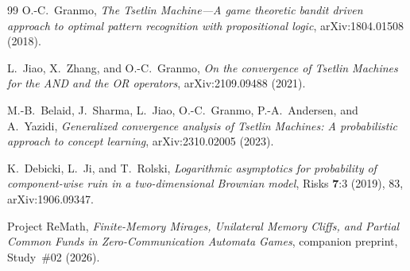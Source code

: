 \documentclass[11pt,reqno]{amsart}
\theoremstyle{definition}
\theoremstyle{remark}
\begin{document}
\begin{thebibliography}{99}
O.-C.~Granmo, \emph{The Tsetlin Machine---A game theoretic bandit driven approach to optimal pattern recognition with propositional logic}, arXiv:1804.01508 (2018).

L.~Jiao, X.~Zhang, and O.-C.~Granmo, \emph{On the convergence of Tsetlin Machines for the AND and the OR operators}, arXiv:2109.09488 (2021).

M.-B.~Belaid, J.~Sharma, L.~Jiao, O.-C.~Granmo, P.-A.~Andersen, and A.~Yazidi, \emph{Generalized convergence analysis of Tsetlin Machines: A probabilistic approach to concept learning}, arXiv:2310.02005 (2023).

K.~Debicki, L.~Ji, and T.~Rolski, \emph{Logarithmic asymptotics for probability of component-wise ruin in a two-dimensional Brownian model}, Risks \textbf{7}:3 (2019), 83, arXiv:1906.09347.

Project ReMath, \emph{Finite-Memory Mirages, Unilateral Memory Cliffs, and Partial Common Funds in Zero-Communication Automata Games}, companion preprint, Study~\#02 (2026).
\end{thebibliography}
\end{document}
